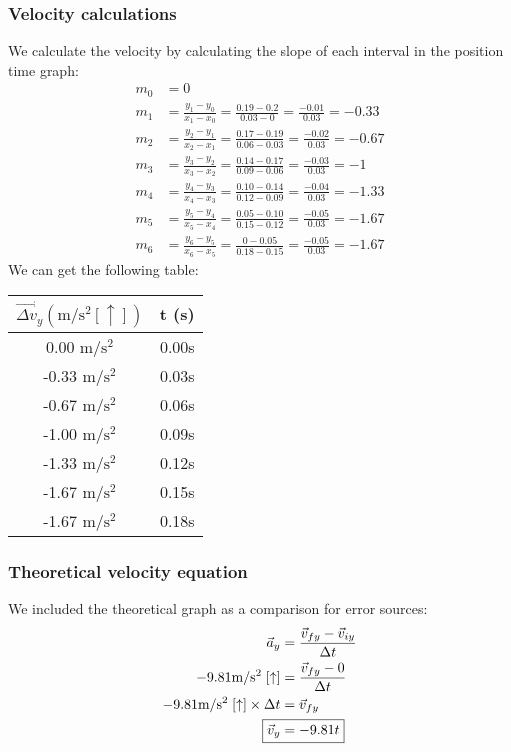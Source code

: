\documentclass[a4paper,12pt]{article}
\begin{document}
	\subsubsection{Velocity calculations}
	We calculate the velocity by calculating the slope of each interval in the position time graph:
	\begin{align*}
		m_0 &= 0 \\
		m_1 &= \frac{y_1 - y_0}{x_1 - x_0} = \frac{0.19 - 0.2}{0.03 - 0} = \frac{-0.01}{0.03} = -0.33 \\
		m_2 &= \frac{y_2 - y_1}{x_2 - x_1} = \frac{0.17 - 0.19}{0.06 - 0.03} = \frac{-0.02}{0.03} = -0.67 \\
		m_3 &= \frac{y_3 - y_2}{x_3 - x_2} = \frac{0.14 - 0.17}{0.09 - 0.06} = \frac{-0.03}{0.03}  = -1 \\
		m_4 &= \frac{y_4 - y_3}{x_4 - x_3} = \frac{0.10 - 0.14}{0.12 - 0.09} = \frac{-0.04}{0.03}  = -1.33 \\
		m_5 &= \frac{y_5 - y_4}{x_5 - x_4} = \frac{0.05 - 0.10}{0.15 - 0.12} = \frac{-0.05}{0.03}  = -1.67 \\
		m_6 &= \frac{y_6 - y_5}{x_6 - x_5} = \frac{0 - 0.05}{0.18 - 0.15} = \frac{-0.05}{0.03} = -1.67
	\end{align*}
	We can get the following table:
	\begin{center}
		\begin{tabular}{ |c|c| } 
			\hline
			$\vec{\Delta v}_y (\text{m}/\text{s}^2 [\uparrow])$ & t (s)\\ 
			\hline\hline
			0.00 $\text{m}/\text{s}^2$ & 0.00s\\
			\hline 
			-0.33 $\text{m}/\text{s}^2$ & 0.03s\\ 
			\hline
			-0.67 $\text{m}/\text{s}^2$ & 0.06s\\
			\hline
			-1.00 $\text{m}/\text{s}^2$ & 0.09s\\
			\hline
			-1.33 $\text{m}/\text{s}^2$ & 0.12s\\
			\hline
			-1.67 $\text{m}/\text{s}^2$ & 0.15s\\
			\hline
			-1.67 $\text{m}/\text{s}^2$ & 0.18s\\
			\hline
		\end{tabular} 
	\end{center}
	\subsubsection{Theoretical velocity equation}
	We included the theoretical graph as a comparison for error sources:
	\begin{align*}
		\vec{a}_y&=\frac{\vec{v}_{fy}-\vec{v}_{iy}}{\Delta t}\\
		-9.81\text{m}/\text{s}^2\;[\uparrow]&=\frac{\vec{v}_{fy}-0}{\Delta t}\\
		-9.81\text{m}/\text{s}^2\;[\uparrow]\times\Delta t&=\vec{v}_{fy}\\
		\Aboxed{\vec{v}_y&=-9.81t}
	\end{align*}
	
\end{document}
